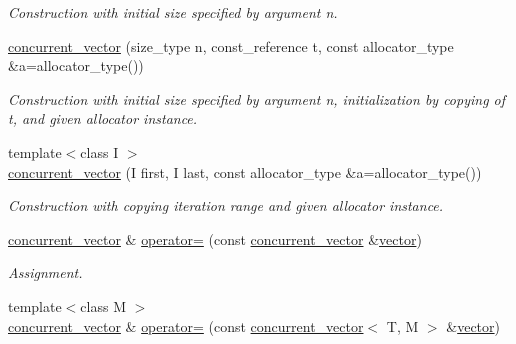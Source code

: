 \begin{DoxyCompactItemize}
\begin{DoxyCompactList}\small\item\em Construction with initial size specified by argument n. \end{DoxyCompactList}\item 
\hypertarget{classtbb_1_1concurrent__vector_a9eec9e1f70f4c6512c28c0b13448ed7d}{}\hyperlink{classtbb_1_1concurrent__vector_a9eec9e1f70f4c6512c28c0b13448ed7d}{concurrent\+\_\+vector} (size\+\_\+type n, const\+\_\+reference t, const allocator\+\_\+type \&a=allocator\+\_\+type())\label{classtbb_1_1concurrent__vector_a9eec9e1f70f4c6512c28c0b13448ed7d}

\begin{DoxyCompactList}\small\item\em Construction with initial size specified by argument n, initialization by copying of t, and given allocator instance. \end{DoxyCompactList}\item 
\hypertarget{classtbb_1_1concurrent__vector_adbec959c61dad09836e8e296c80fbd6f}{}{\footnotesize template$<$class I $>$ }\\\hyperlink{classtbb_1_1concurrent__vector_adbec959c61dad09836e8e296c80fbd6f}{concurrent\+\_\+vector} (I first, I last, const allocator\+\_\+type \&a=allocator\+\_\+type())\label{classtbb_1_1concurrent__vector_adbec959c61dad09836e8e296c80fbd6f}

\begin{DoxyCompactList}\small\item\em Construction with copying iteration range and given allocator instance. \end{DoxyCompactList}\item 
\hypertarget{classtbb_1_1concurrent__vector_a61eb15b454034c9ec9c912dd0dd2ad4b}{}\hyperlink{classtbb_1_1concurrent__vector}{concurrent\+\_\+vector} \& \hyperlink{classtbb_1_1concurrent__vector_a61eb15b454034c9ec9c912dd0dd2ad4b}{operator=} (const \hyperlink{classtbb_1_1concurrent__vector}{concurrent\+\_\+vector} \&\hyperlink{structvector}{vector})\label{classtbb_1_1concurrent__vector_a61eb15b454034c9ec9c912dd0dd2ad4b}

\begin{DoxyCompactList}\small\item\em Assignment. \end{DoxyCompactList}\item 
\hypertarget{classtbb_1_1concurrent__vector_a166ef89ae2fbb4879487ecc8627f2fca}{}{\footnotesize template$<$class M $>$ }\\\hyperlink{classtbb_1_1concurrent__vector}{concurrent\+\_\+vector} \& \hyperlink{classtbb_1_1concurrent__vector_a166ef89ae2fbb4879487ecc8627f2fca}{operator=} (const \hyperlink{classtbb_1_1concurrent__vector}{concurrent\+\_\+vector}$<$ T, M $>$ \&\hyperlink{structvector}{vector})\label{classtbb_1_1concurrent__vector_a166ef89ae2fbb4879487ecc8627f2fca}


\end{DoxyCompactItemize}
